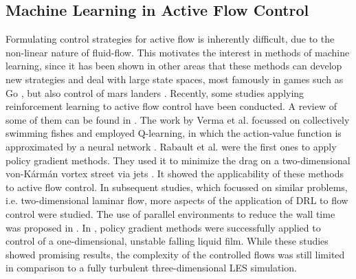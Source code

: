 \subsection{Machine Learning in Active Flow Control}
Formulating control strategies for active flow is inherently difficult, due to the non-linear nature of fluid-flow. This motivates the interest in methods of machine learning, since it has been shown in other areas that these methods can develop new strategies and deal with large state spaces, most famously in games such as Go \cite{silver_mastering_2017}, but also control of mars landers \cite{gaudet_deep_2020}. Recently, some studies applying reinforcement learning to active flow control have been conducted. A review of some of them can be found in \cite{garnier_review_2019}. The work by Verma et al. focussed on collectively swimming fishes and employed Q-learning, in which the action-value function is approximated by a neural network \cite{verma_efficient_2018}. Rabault et al. were the first ones to apply policy gradient methods. They used it to minimize the drag on a two-dimensional von-K\'arm\'an vortex street via jets \cite{rabault_deep_2018}. It showed the applicability of these methods to active flow control. In subsequent studies, which focussed on similar problems, i.e. two-dimensional laminar flow, more aspects of the application of DRL to flow control were studied. The use of parallel environments to reduce the wall time was proposed in \cite{rabault_accelerating_2019}. In \cite{belus_exploiting_2019}, policy gradient methods were successfully applied to control of a one-dimensional, unstable falling liquid film. While these studies showed promising results, the complexity of the controlled flows was still limited in comparison to a fully turbulent three-dimensional LES simulation.
